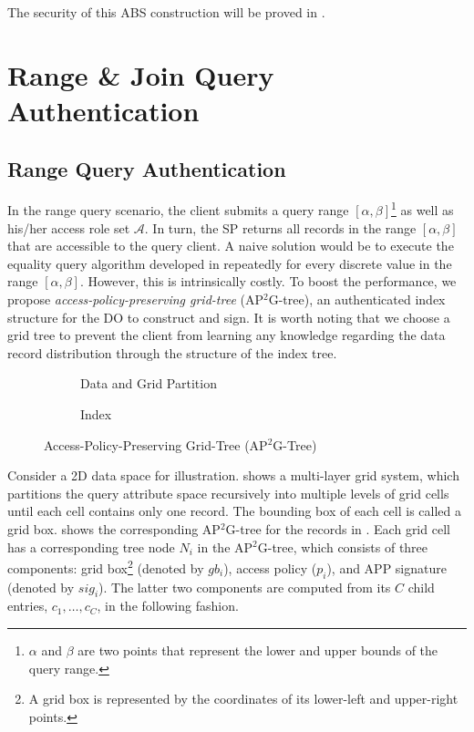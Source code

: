 The security of this ABS construction will be proved in .

\section{Range \& Join Query Authentication}\label{sec:access-control:range-query}

\subsection{Range Query Authentication}
In the range query scenario, the client submits a query range $[\alpha, \beta]$\footnote{$\alpha$ and $\beta$ are two points that represent the lower and upper bounds of the query range.} as well as his/her access role set $\mathcal{A}$. In turn, the SP returns all records in the range $[\alpha, \beta]$ that are accessible to the query client. A naive solution would be to execute the equality query algorithm developed in  repeatedly for every discrete value in the range $[\alpha, \beta]$. However, this is intrinsically costly. To boost the performance, we propose \emph{access-policy-preserving grid-tree} (AP$^2$G-tree), an authenticated index structure for the DO to construct and sign.
It is worth noting that we choose a grid tree to prevent the client from learning any knowledge regarding the data record distribution through the structure of the index tree.

\begin{figure}[t]
  \centering
  \begin{subfigure}[b]{\linewidth}
    \centering
    \resizebox{.7\linewidth}{!}{}
    \caption{Data and Grid Partition}\label{fig:access-control:access-tree-struct}
  \end{subfigure}
  \begin{subfigure}[b]{\linewidth}
    \centering
    \resizebox{.7\linewidth}{!}{}
    \caption{Index}\label{fig:access-control:access-tree-index}
  \end{subfigure}
  \caption{Access-Policy-Preserving Grid-Tree (AP$^2$G-Tree)}\label{fig:access-control:access-tree}
\end{figure}

Consider a 2D data space for illustration.  shows a multi-layer grid system, which partitions the query attribute space recursively into multiple levels of grid cells until each cell contains only one record. The bounding box of each cell is called a grid box.  shows the corresponding AP$^2$G-tree for the records in . Each grid cell has a corresponding tree node $N_i$ in the AP$^2$G-tree, which consists of three components: grid box\footnote{A grid box is represented by the coordinates of its lower-left and upper-right points.} (denoted by $gb_i$), access policy ($p_i$), and APP signature (denoted by $sig_i$). The latter two components are computed from its $C$ child entries, $c_1, \dots, c_C$, in the following fashion.

